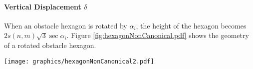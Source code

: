 \paragraph{Vertical Displacement $\delta$}

When an obstacle hexagon is rotated by $\alpha_i$, the height of the hexagon becomes $2 s(n,m) \sqrt{3} \sec \alpha_i$.
Figure \ref{fig:hexagonNonCanonical.pdf} shows the geometry of a rotated obstacle hexagon.%

\begin{minipage}{\linewidth}
\begin{center}
\texttt{[image: graphics/hexagonNonCanonical2.pdf]}
\label{fig:hexagonNonCanonical.pdf}
\end{center}
\end{minipage}




